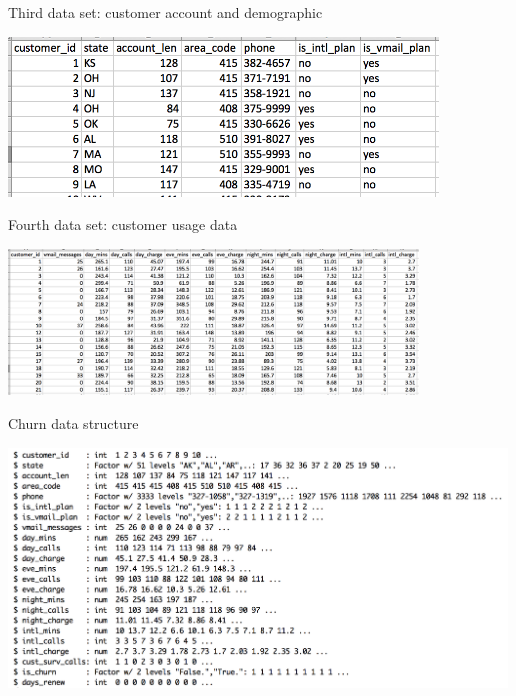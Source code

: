 \documentclass[10pt]{beamer}
\begin{document}
    \begin{frame}{Third data set: customer account and demographic}
      \begin{center}
        \includegraphics[height=120pt]{graphs/dataset_customer_account}
      \end{center}
    \end{frame}

    \begin{frame}{Fourth data set: customer usage data}
      \begin{center}
        \includegraphics[height=110pt]{graphs/dataset_customer_usage}
      \end{center}
    \end{frame}

    \begin{frame}{Churn data structure}
      \begin{center}
        \includegraphics[height=180pt]{graphs/dataset_churn_str}
      \end{center}
    \end{frame}
\end{document}
